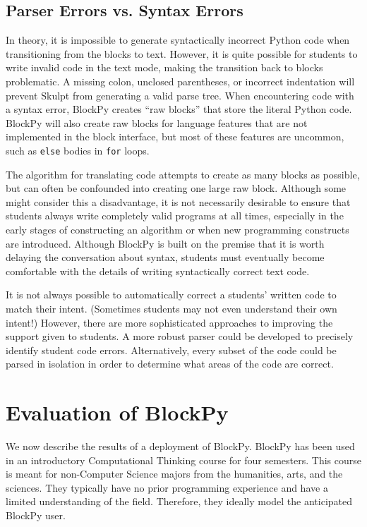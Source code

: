 \documentclass[10pt,journal,compsoc]{IEEEtran}
\begin{document}
\subsection{Parser Errors vs. Syntax Errors}

In theory, it is impossible to generate syntactically incorrect Python code when transitioning from the blocks to text.
However, it is quite possible for students to write invalid code in the text mode, making the transition back to blocks problematic.
A missing colon, unclosed parentheses, or incorrect indentation will prevent Skulpt from generating a valid parse tree.
When encountering code with a syntax error, BlockPy creates ``raw blocks'' that store the literal Python code.
BlockPy will also create raw blocks for language features that are not implemented in the block interface, but most of these features are uncommon, such as \texttt{else} bodies in \texttt{for} loops.

The algorithm for translating code attempts to create as many blocks as possible, but can often be confounded into creating one large raw block.
Although some might consider this a disadvantage, it is not necessarily desirable to ensure that students always write completely valid programs at all times, especially in the early stages of constructing an algorithm or when new programming constructs are introduced.
Although BlockPy is built on the premise that it is worth delaying the conversation about syntax, students must eventually become comfortable with the details of writing syntactically correct text code.

It is not always possible to automatically correct a students' written code to match their intent.
(Sometimes students may not even understand their own intent!)
However, there are more sophisticated approaches to improving the support given to students.
A more robust parser could be developed to precisely identify student code errors.
Alternatively, every subset of the code could be parsed in isolation in order to determine what areas of the code are correct.

\section{Evaluation of BlockPy}
\label{sec:Evaluation}

We now describe the results of a deployment of BlockPy.
BlockPy has been used in an introductory Computational Thinking course for four semesters.
This course is meant for non-Computer Science majors from the humanities, arts, and the sciences.
They typically have no prior programming experience and have a limited understanding of the field. 
Therefore, they ideally model the anticipated BlockPy user.
\end{document}
